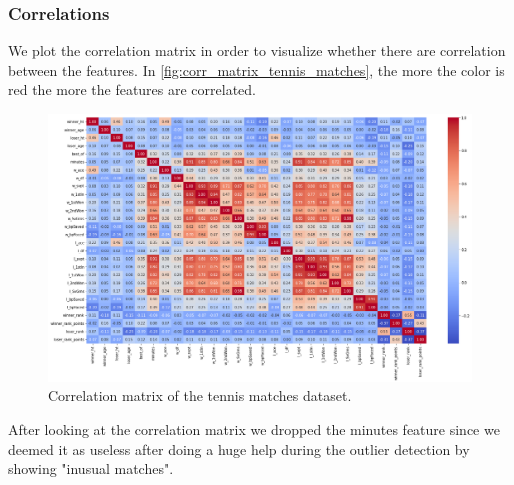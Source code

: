 \subsubsection{Correlations}
We plot the correlation matrix in order to visualize whether there are correlation between the features. In \autoref{fig:corr_matrix_tennis_matches}, the more the color is red the more the features are correlated.
\begin{figure}[H]
    \centering
    \includegraphics[width= 0.74\linewidth]{images/data_understanding/correlation.png}
    \caption{Correlation matrix of the tennis matches dataset.}
    \label{fig:corr_matrix_tennis_matches}
\end{figure}
After looking at the correlation matrix we dropped the minutes feature since we deemed it as useless after doing a huge help during the outlier detection by showing "inusual matches". 